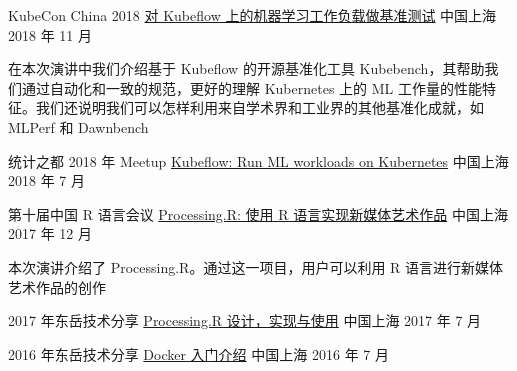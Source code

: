 
\begin{cventries}

  \cventry
    {KubeCon China 2018}
    {\href{http://sched.co/FvLV}{对 Kubeflow 上的机器学习工作负载做基准测试}}
    {中国上海} %
    {2018 年 11 月} %
    {
      \begin{cvitems} %
        \item {
          在本次演讲中我们介绍基于 Kubeflow 的开源基准化工具 Kubebench，其帮助我们通过自动化和一致的规范，更好的理解 Kubernetes 上的 ML 工作量的性能特征。我们还说明我们可以怎样利用来自学术界和工业界的其他基准化成就，如 MLPerf 和 Dawnbench
        }
      \end{cvitems}
    }

  \cventry
    {统计之都 2018 年 Meetup}
    {\href{https://docs.google.com/presentation/d/1ED24TCnlBVzyJz0aCEAtXQQh0_W1RKSeapP3QZ0fTKA/edit?usp=sharing}{Kubeflow: Run ML workloads on Kubernetes}}
    {中国上海} %
    {2018 年 7 月} %
    {
    }

  \cventry
    {第十届中国 R 语言会议}
    {\href{http://slides.com/gaocegege/processing-r}{
      Processing.R: 使用 R 语言实现新媒体艺术作品}}
    {中国上海} %
    {2017 年 12 月} %
    {
      \begin{cvitems} %
        \item {
          本次演讲介绍了 Processing.R。通过这一项目，用户可以利用 R 语言进行新媒体艺术作品的创作
        }
      \end{cvitems}
    }

  \cventry
    {2017 年东岳技术分享}
    {\href{https://docs.google.com/presentation/d/1ylRT4VvydWbR7SyTQzNZOLpkXtgSZJiEl5nmXY1KuJw/edit?usp=sharing}{Processing.R 设计，实现与使用}}
    {中国上海} %
    {2017 年 7 月} %
    {
    }

  \cventry
    {2016 年东岳技术分享}
    {\href{https://docs.google.com/presentation/d/1Ru4Dm9TLoyxnJgFqvsCHrb82VT622H-zBSgAe1vJL44/edit?usp=sharing}{Docker 入门介绍}}
    {中国上海} %
    {2016 年 7 月} %
    {
    }

\end{cventries}
